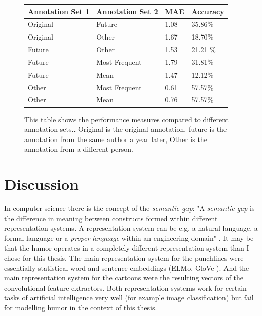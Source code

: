 \documentclass[draft,final,oneside]{vutinfth} %
\begin{document}
\begin{figure}
\centering
\begin{tabular}{|l|l|l|l|} 
\hline
\textbf{Annotation Set 1} & \textbf{Annotation Set 2} & \textbf{MAE} & \textbf{Accuracy}  \\ 
\hline
Original & Future & 1.08 & 35.86\% \\
Original & Other & 1.67 & 18.70\% \\
Future & Other & 1.53 & 21.21 \% \\
Future & Most Frequent & 1.79 & 31.81\% \\
Future & Mean & 1.47 & 12.12\%\\
Other & Most Frequent & 0.61 & 57.57\%
 \\
Other & Mean & 0.76 &  57.57\%\\
\hline
\end{tabular}
\caption{This table shows the performance measures compared to different annotation sets.. Original is the original annotation, future is the annotation from the same author a year later, Other is the annotation from a different person.}
\label{labelreproduc}
\end{figure}

\pagebreak

\section{Discussion}

In computer science there is the concept of the \textit{semantic gap}: "A \textit{semantic gap} is the difference in meaning between constructs formed within different representation systems. A representation system can be e.g. a natural language, a formal language
or a \textit{proper language} within an engineering domain" \cite{semanticgap}. It may be that the humor operates in a completely different representation system than I chose for this thesis. The main representation system for the punchlines were essentially statistical word and sentence embeddings (ELMo, GloVe \cite{glovepage}\cite{elmo}). And the main representation system for the cartoons were the resulting vectors of the convolutional feature extractors. Both representation systems work for certain tasks of artificial intelligence very well (for example image classification) but fail for modelling humor in the context of this thesis.
\end{document}
